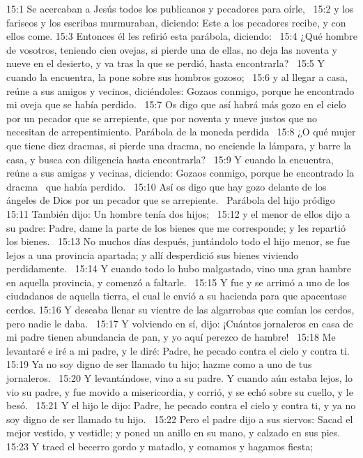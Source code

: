 15:1 Se acercaban a Jesús todos los publicanos y pecadores para oírle,  
15:2 y los fariseos y los escribas murmuraban, diciendo: Este a los pecadores recibe, y con ellos come. 
15:3 Entonces él les refirió esta parábola, diciendo:  
15:4 ¿Qué hombre de vosotros, teniendo cien ovejas, si pierde una de ellas, no deja las noventa y nueve en el desierto, y va tras la que se perdió, hasta encontrarla?  
15:5 Y cuando la encuentra, la pone sobre sus hombros gozoso;  
15:6 y al llegar a casa, reúne a sus amigos y vecinos, diciéndoles: Gozaos conmigo, porque he encontrado mi oveja que se había perdido.  
15:7 Os digo que así habrá más gozo en el cielo por un pecador que se arrepiente, que por noventa y nueve justos que no necesitan de arrepentimiento. 
Parábola de la moneda perdida  
15:8 ¿O qué mujer que tiene diez dracmas, si pierde una dracma, no enciende la lámpara, y barre la casa, y busca con diligencia hasta encontrarla?  
15:9 Y cuando la encuentra, reúne a sus amigas y vecinas, diciendo: Gozaos conmigo, porque he encontrado la dracma  que había perdido.  
15:10 Así os digo que hay gozo delante de los ángeles de Dios por un pecador que se arrepiente.  
Parábola del hijo pródigo  
15:11 También dijo: Un hombre tenía dos hijos;  
15:12 y el menor de ellos dijo a su padre: Padre, dame la parte de los bienes que me corresponde; y les repartió los bienes.  
15:13 No muchos días después, juntándolo todo el hijo menor, se fue lejos a una provincia apartada; y allí desperdició sus bienes viviendo perdidamente.  
15:14 Y cuando todo lo hubo malgastado, vino una gran hambre en aquella provincia, y comenzó a faltarle.  
15:15 Y fue y se arrimó a uno de los ciudadanos de aquella tierra, el cual le envió a su hacienda para que apacentase cerdos. 
15:16 Y deseaba llenar su vientre de las algarrobas que comían los cerdos, pero nadie le daba.  
15:17 Y volviendo en sí, dijo: ¡Cuántos jornaleros en casa de mi padre tienen abundancia de pan, y yo aquí perezco de hambre!  
15:18 Me levantaré e iré a mi padre, y le diré: Padre, he pecado contra el cielo y contra ti.  
15:19 Ya no soy digno de ser llamado tu hijo; hazme como a uno de tus jornaleros.  
15:20 Y levantándose, vino a su padre. Y cuando aún estaba lejos, lo vio su padre, y fue movido a misericordia, y corrió, y se echó sobre su cuello, y le besó.  
15:21 Y el hijo le dijo: Padre, he pecado contra el cielo y contra ti, y ya no soy digno de ser llamado tu hijo.  
15:22 Pero el padre dijo a sus siervos: Sacad el mejor vestido, y vestidle; y poned un anillo en su mano, y calzado en sus pies.  
15:23 Y traed el becerro gordo y matadlo, y comamos y hagamos fiesta;  
